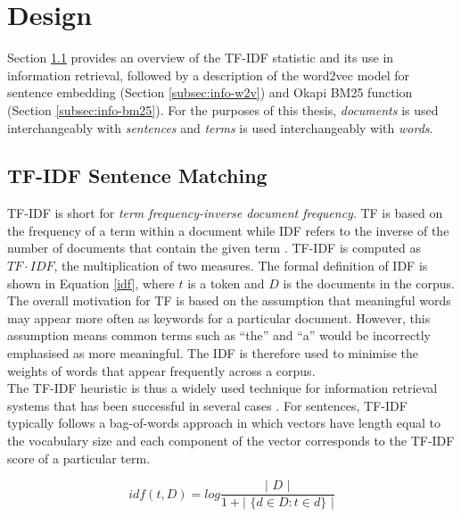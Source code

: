 \section{Design}
\label{sec:info-design}
Section \ref{subsec:info-tfidf} provides an overview of the TF-IDF statistic and its use in information retrieval, followed by a description of the word2vec model for sentence embedding (Section \ref{subsec:info-w2v}) and Okapi BM25 function (Section \ref{subsec:info-bm25}). For the purposes of this thesis, \textit{documents} is used interchangeably with \textit{sentences} and \textit{terms} is used interchangeably with \textit{words}.

\subsection{TF-IDF Sentence Matching}
\label{subsec:info-tfidf}
TF-IDF is short for \textit{term frequency-inverse document frequency}. TF is based on the frequency of a term within a document while IDF refers to the inverse of the number of documents that contain the given term \cite{robertson2004understanding}. TF-IDF is computed as $TF\cdot IDF$, the multiplication of two measures. The formal definition of IDF is shown in Equation \ref{idf}, where $t$ is a token and $D$ is the documents in the corpus. The overall motivation for TF is based on the assumption that meaningful words may appear more often as keywords for a particular document. However, this assumption means common terms such as ``the'' and ``a'' would be incorrectly emphasised as more meaningful. The IDF is therefore used to minimise the weights of words that appear frequently across a corpus. \\
The TF-IDF heuristic is thus a widely used technique for information retrieval systems that has been successful in several cases \cite{tfidf-explain}. For sentences, TF-IDF typically follows a bag-of-words approach in which vectors have length equal to the vocabulary size and each component of the vector corresponds to the TF-IDF score of a particular term.

\begin{equation}
\label{idf}
idf( t, D ) = log \frac{ \text{| } D \text{ |} }{ 1 + \text{| } \{ d \in D : t \in d \} \text{ |} }
\end{equation}

